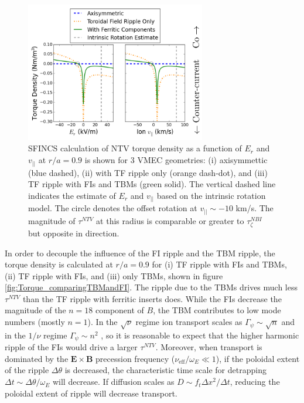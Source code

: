 \documentclass{article}
\begin{document}
\FloatBarrier

\begin{figure}[h!]
\centering
\includegraphics[width=0.7\textwidth]{Torque_ErandV.png}
\caption{\label{fig:Torque_ErandV} SFINCS calculation of NTV torque density as a function of $E_r$ and $v_{||}$ at $r/a = 0.9$ is shown for 3 VMEC geometries: (i) axisymmettic (blue dashed), (ii) with TF ripple only (orange dash-dot), and (iii) TF ripple with FIs and TBMs (green solid). The vertical dashed line indicates the estimate of $E_r$ and $v_{||}$ based on the intrinsic rotation model. The circle denotes the offset rotation at $v_{||} \sim -10$ km/s. The magnitude of $\tau^{NTV}$ at this radius is comparable or greater to $\tau^{NBI}_{\zeta}$ but opposite in direction. }
\end{figure}

In order to decouple the influence of the FI ripple and the TBM ripple, the torque density is calculated at $r/a = 0.9$ for (i) TF ripple with FIs and TBMs, (ii) TF ripple with FIs, and (iii) only TBMs, shown in figure \ref{fig:Torque_comparingTBMandFI}. The ripple due to the TBMs drives much less $\tau^{NTV}$ than the TF ripple with ferritic inserts does.  While the FIs decrease the magnitude of the $n = 18$ component of $B$, the TBM contributes to low mode numbers (mostly $n = 1$). In the $\sqrt{\nu}$ regime ion transport scales as $\Gamma_{\psi} \sim \sqrt{n}$ and in the $1/\nu$ regime $\Gamma_{\psi} \sim n^2$ \cite{Shaing2010}, so it is reasonable to expect that the higher harmonic ripple of the FIs would drive a larger $\tau^{NTV}$. Moreover, when transport is dominated by the $\bm{E} \times \bm{B}$ precession frequency ($\nu_{\text{eff}}/\omega_E \ll 1$), if the poloidal extent of the ripple $\Delta \theta$ is decreased, the characteristic time scale for detrapping $\Delta t \sim \Delta \theta/ \omega_E$ will decrease. If diffusion scales as $D \sim f_t \Delta x^2/\Delta t$, reducing the poloidal extent of ripple will decrease transport. 
\end{document}
